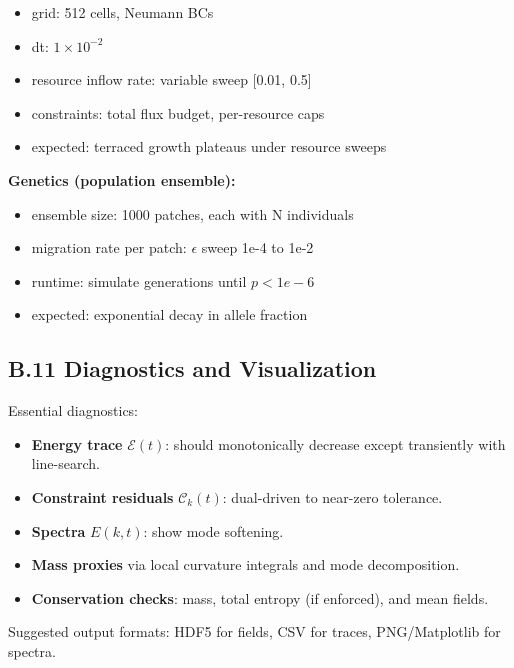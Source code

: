 \documentclass[11pt,a4paper]{article}
\begin{document}
\begin{itemize}
  \item grid: 512 cells, Neumann BCs
  \item dt: \(1\times 10^{-2}\)
  \item resource inflow rate: variable sweep [0.01, 0.5]
  \item constraints: total flux budget, per-resource caps
  \item expected: terraced growth plateaus under resource sweeps
\end{itemize}

\textbf{Genetics (population ensemble):}

\begin{itemize}
  \item ensemble size: 1000 patches, each with N individuals
  \item migration rate per patch: \(\epsilon\) sweep 1e-4 to 1e-2
  \item runtime: simulate generations until \(p<1e-6\)
  \item expected: exponential decay in allele fraction
\end{itemize}

\subsection{B.11 Diagnostics and Visualization}

Essential diagnostics:

\begin{itemize}
  \item \textbf{Energy trace} \(\mathcal{E}(t)\): should monotonically decrease except transiently with line-search.
  \item \textbf{Constraint residuals} \(\mathcal{C}_k(t)\): dual-driven to near-zero tolerance.
  \item \textbf{Spectra} \(E(k,t)\): show mode softening.
  \item \textbf{Mass proxies} via local curvature integrals and mode decomposition.
  \item \textbf{Conservation checks}: mass, total entropy (if enforced), and mean fields.
\end{itemize}

Suggested output formats: HDF5 for fields, CSV for traces, PNG/Matplotlib for spectra.

\end{document}
